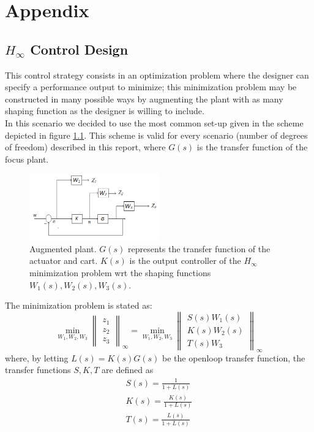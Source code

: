 \chapter{Appendix}
\section{$H_\infty$ Control Design} \label{app:hinf}
This control strategy consists in an optimization problem where the designer can specify a performance output to minimize; this minimization problem may be constructed in many possible ways by augmenting the plant with as many shaping function as the designer is willing to include.\\

In this scenario we decided to use the most common set-up given in the scheme depicted in figure \ref{fig:hinfscheme}. This scheme is valid for every scenario (number of degrees of freedom) described in this report, where $G(s)$ is the transfer function of the focus plant.\\

\begin{figure}[h]
	\centering
	\includegraphics[width=0.5\textwidth]{img/hinf_scheme.png}
	\caption{Augmented plant. $G(s)$ represents the transfer function of the actuator and cart. $K(s)$ is the output controller of the $H_\infty$ minimization problem wrt the shaping functions $W_1(s), W_2(s), W_3(s)$.}
	\label{fig:hinfscheme}
\end{figure}

The minimization problem is stated as:
\begin{equation}
	\min_{W_1, W_2, W_3} 
		\begin{Vmatrix}
			z_1 \\ z_2 \\ z_3
		\end{Vmatrix}_\infty
	=
	\min_{W_1, W_2, W_3} 
		\begin{Vmatrix}
			S(s) W_1(s) \\ K(s) W_2(s) \\ T(s) W_3
		\end{Vmatrix}_\infty
\end{equation}
where, by letting $L(s) = K(s)G(s)$ be the openloop transfer function, the transfer functions $S, K, T$ are defined as
\begin{gather}
	S(s) = \frac{1}{1+L(s)} \\
	K(s)=\frac{K(s)}{1+L(s)} \\
	T(s)=\frac{L(s)}{1+L(s)}
\end{gather} 



